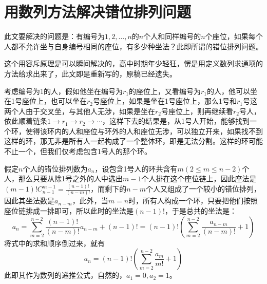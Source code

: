 
\section{用数列方法解决错位排列问题}
\label{sec:derangement-problem}

此文要解决的问题是：有编号为$1,2,\ldots,n$的$n$个人和同样编号的$n$个座位，如果每个人都不允许坐与自身编号相同的座位，有多少种坐法？此即所谓的错位排列问题。

这个用容斥原理是可以瞬间解决的，高中时期年少轻狂，愣是用定义数列求通项的方法给求出来了，此文即是重新写的，原稿已经遗失。

考虑编号为1的人，假如他坐在编号为$r_1$的座位上，又看编号为$r_1$的人，他可以坐在1号座位上，也可以坐在$r_2$号座位上，如果是坐在1号座位上，那么1号和$r_1$号这两个人由于交叉坐，与其他人无涉，如果是坐在$r_2$号座位上，则再继续看$r_2$号人，依此顺着链条$1\rightarrow r_1 \rightarrow r_2 \rightarrow \cdots$，这样下去的结果是，从1号人开始，能够找到一个环，使得该环内的人和座位与环外的人和座位无涉，可以独立开来，如果找不到这样的环，那无非是所有人一起构成了一个整体环，即是无法分割。这样的环可能不止一个，但我们仅考虑包含1号人的那个环。

假定$n$个人的错位排列数为$a_n$，设包含1号人的环共含有$m(2\leqslant m \leqslant n-2)$个人，那么只要从除1号之外的人中选出$m-1$个人排在这个座位链上，因此座法是$(m-1)!C_{n-1}^{m-1}=\frac{(n-1)!}{(n-m)!}$，而剩下的$n-m$个人又组成了一个较小的错位排列，因此其坐法数是$a_{n-m}$，此外，当$m=n$时，所有人构成一个环，只要把他们按照座位链排成一排即可，所以此时的坐法是$(n-1)!$，于是总共的坐法是：
\begin{equation*}
  a_n=\sum_{m=2}^{n-2}\frac{(n-1)!}{(n-m)!}a_{n-m}+(n-1)!=(n-1)!(\sum_{m=2}^{n-2}\frac{a_{n-m}}{(n-m)!}+1)
\end{equation*}
将式中的求和顺序倒过来，就有
\begin{equation}
  \label{eq:requsive-equation-derangement}
  a_n=(n-1)!(\sum_{m=2}^{n-2}\frac{a_{m}}{m!}+1)
\end{equation}
此即其作为数列的递推公式，自然的，$a_1=0,a_2=1$。

